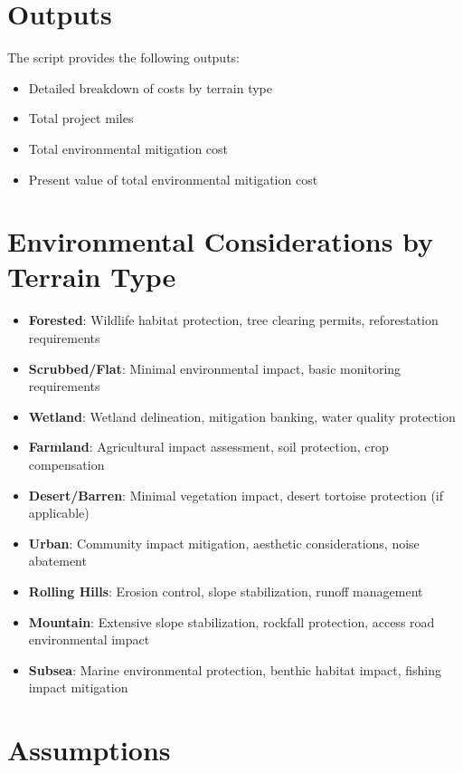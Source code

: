 \documentclass[12pt]{article}
\begin{document}
\section{Outputs}

The script provides the following outputs:
\begin{itemize}
    \item Detailed breakdown of costs by terrain type
    \item Total project miles
    \item Total environmental mitigation cost
    \item Present value of total environmental mitigation cost
\end{itemize}

\section{Environmental Considerations by Terrain Type}

\begin{itemize}
    \item \textbf{Forested}: Wildlife habitat protection, tree clearing permits, reforestation requirements
    \item \textbf{Scrubbed/Flat}: Minimal environmental impact, basic monitoring requirements
    \item \textbf{Wetland}: Wetland delineation, mitigation banking, water quality protection
    \item \textbf{Farmland}: Agricultural impact assessment, soil protection, crop compensation
    \item \textbf{Desert/Barren}: Minimal vegetation impact, desert tortoise protection (if applicable)
    \item \textbf{Urban}: Community impact mitigation, aesthetic considerations, noise abatement
    \item \textbf{Rolling Hills}: Erosion control, slope stabilization, runoff management
    \item \textbf{Mountain}: Extensive slope stabilization, rockfall protection, access road environmental impact
    \item \textbf{Subsea}: Marine environmental protection, benthic habitat impact, fishing impact mitigation
\end{itemize}

\section{Assumptions}
\end{document}
